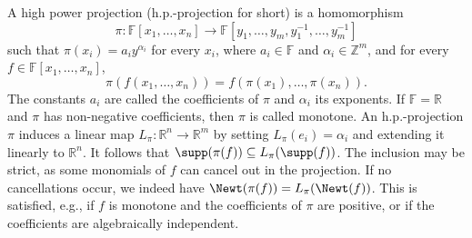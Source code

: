 A high power projection (h.p.-projection for short) is a homomorphism
\[\pi:\mathbb F[x_1,\ldots,x_n]\to\mathbb F[y_1,\ldots,y_m,y_1^{-1},\ldots,y_m^{-1}]\]
such that $\pi(x_i)=a_i y^{\alpha_i}$ for every $x_i$, where $a_i\in\mathbb F$ and $\alpha_i\in\mathbb Z^m$, and for every $f\in\mathbb F[x_1,\ldots,x_n]$,
\[\pi(f(x_1,\ldots,x_n))=f(\pi(x_1),\ldots,\pi(x_n)).\]
The constants $a_i$ are called the coefficients of $\pi$ and $\alpha_i$ its exponents. If $\mathbb F=\mathbb R$ and $\pi$ has non-negative coefficients, then $\pi$ is called monotone.
An h.p.-projection $\pi$ induces a linear map $L_\pi:\mathbb R^n\to\mathbb R^m$ by setting $L_\pi(e_i)=\alpha_i$ and extending it linearly to $\mathbb R^n$. It follows that $\supp(\pi(f))\subseteq L_\pi(\supp(f))$. The inclusion may be strict, as some monomials of $f$ can cancel out in the projection. If no cancellations occur, we indeed have $\Newt(\pi(f))=L_\pi(\Newt(f))$. This is satisfied, e.g., if $f$ is monotone and the coefficients of $\pi$ are positive, or if the coefficients are algebraically independent.
